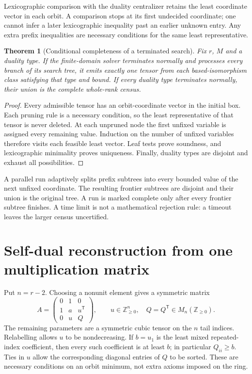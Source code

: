 \documentclass[11pt,a4paper]{article}
\newtheorem{theorem}{Theorem}[section]\newtheorem{proposition}[theorem]{Proposition}
\theoremstyle{definition}\newtheorem{definition}[theorem]{Definition}\newtheorem{remark}[theorem]{Remark}
\newcommand{\NN}{\mathbb Z_{\geq0}}\newcommand{\FPdim}{\operatorname{FPdim}}
\begin{document}
Lexicographic comparison with the duality centralizer retains the least
coordinate vector in each orbit. A comparison stops at its first undecided
coordinate; one cannot infer a later lexicographic inequality past an earlier
unknown entry. Any extra prefix inequalities are necessary conditions for the
same least representative.

\begin{theorem}[Conditional completeness of a terminated search]
Fix $r$, $M$ and a duality type. If the finite-domain solver terminates normally
and processes every branch of its search tree, it emits exactly one tensor from
each based-isomorphism class satisfying that type and bound. If every duality
type terminates normally, their union is the complete whole-rank census.
\end{theorem}
\begin{proof}
Every admissible tensor has an orbit-coordinate vector in the initial box.
Each pruning rule is a necessary condition, so the least representative of
that tensor is never deleted. At each unpruned node the first unfixed variable
is assigned every remaining value. Induction on the number of unfixed variables
therefore visits each feasible least vector. Leaf tests prove soundness, and
lexicographic minimality proves uniqueness. Finally, duality types are disjoint
and exhaust all possibilities.
\end{proof}

A parallel run adaptively splits prefix subtrees into every bounded value of
the next unfixed coordinate. The resulting frontier subtrees are disjoint and
their union is the original tree. A run is marked complete only after every
frontier subtree finishes. A time limit is not a
mathematical rejection rule: a timeout leaves the larger census uncertified.

\section{Self-dual reconstruction from one multiplication matrix}
Put $n=r-2$. Choosing a nonunit element gives a symmetric matrix
\[
 A=\begin{pmatrix}0&1&0\\1&a&u^{\mathsf T}\\0&u&Q\end{pmatrix},
 \qquad u\in\NN^n,\quad Q=Q^{\mathsf T}\in M_n(\NN).
\]
The remaining parameters are a symmetric cubic tensor on the $n$ tail indices.
Relabelling allows $u$ to be nondecreasing. If $b=u_1$ is the least mixed
repeated-index coefficient, then every such coefficient is at least $b$;
in particular $Q_{ii}\geq b$. Ties in $u$ allow the corresponding diagonal
entries of $Q$ to be sorted. These are necessary conditions on an orbit minimum,
not extra axioms imposed on the ring.
\end{document}
